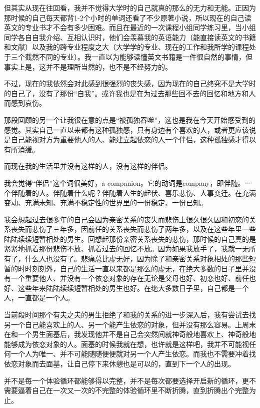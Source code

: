 但其实从现在往回看，我并不觉得大学时的自己就真的那么的无力和无能。正因为那时候的自己每天都背1-2个小时的单词还看了不少原著小说，所以现在的自己读英文的专业书才不会有多少困难。而且在最近的一次课程小组同学练习里，当小组同学各自自我介绍、互相认识时，他们会羡慕我的英语能力（能直接读英文的书籍和文献）以及我的跨专业程度之大（大学学的专业、现在的工作和我所学的课程处于三个截然不同的专业）。我一直以为能够读懂英文书籍是一件很自然的事情，但事实上是，这并不是理所当然的，也不是不经努力的。

不过，现在的我依然会对此感到很强烈的丧失感，因为现在的自己终究不是大学时的自己了，没有了那份“自我”。或许我也是在为过去那些回不去的回忆和地方和人而感到哀伤。

那段回顾的另一个让我很在意的点是“被孤独吞噬”，这也是我在今天开始感受到的感觉。其实自己一直以来都有这种孤独感，只有身边有个喜欢的人，或者更应该说是自己能视对方为重要他人的人、能建立起依恋的人\pozhehao{}一个伴侣，这种孤独感才得以有所消缓。

而现在我的生活里并没有这样的人，没有这样的伴侣。

我会觉得“伴侣”这个词很美好，a companion。它的动词是company，即伴随。一个伴随着的人。伴随着什么呢？伴随着人生的起伏、喜乐悲伤、人事变迁。在充满变动、充满未知、充满不稳定性的世界里的一份稳定、一份已知。

我会想起过去很多年的自己会因为亲密关系的丧失而悲伤上很久很久\pozhehao{}因和初恋的关系丧失而悲伤了三年多，因前任的关系丧失而悲伤了两年多，以及在这些年里一些陆陆续续短暂相处的男生。回想起那份亲密关系丧失的悲伤，那时候的自己真的是紧紧地抓着那份悲伤不放、抓着过去的回忆不放。因为如果我放手了，我就一无所有了，什么人也没有了。悲痛总比虚无好，因为除了和亲密关系对象相处的那些短暂的时时刻刻外，自己的生活一直以来都是那么的虚无，在绝大多数的日子里并没有一个重要他人、并没有一个依恋对象的存在\pozhehao{}无论是父母也好、初恋也好、前任也好、这些年来陆陆续续短暂相处的男生也好。在绝大多数日子里，自己都是一个人，一直都是一个人。

当前段时间那个有夫之夫的男生拒绝了和我的关系的进一步深入后，我有尝试去找另一个自己能喜欢上的人、另一个能产生依恋的对象，但并没有那么容易。上周末在和一个男生面基后，我发现他并不是自己会突然间就神奇般地喜欢上、神奇般地能够成为依恋对象的人。面基的时候我就在想，也许就是这样吧，我并不可能视任何一个人为唯一、并不可能随随便便就对另一个人产生依恋。而我也不需要冲着找依恋对象而去面基，让自己停下来休憩也是可以的，直到下一个人的出现。

并不是每一个体验循环都能够得以完整，并不是每次都要选择开启新的循环，更不需要逼着自己在一次又一次的不完整的体验循环里不断折腾，直到折腾出个完整为止。

